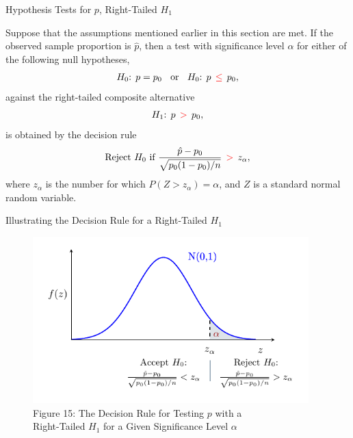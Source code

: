 \documentclass[pdf]{beamer}
\theoremstyle{remark}
\theoremstyle{definition}
\begin{document}
\begin{frame}[t, label=pRT]{Hypothesis Tests for $p$, Right-Tailed $H_1$}
\small
\begin{tcolorbox}[colback=white!5,colframe=franklinblue]%
Suppose that the assumptions mentioned earlier in this section are met. If the observed sample proportion is $\hat{p}$, then a test with significance level $\alpha$ for either of the following null hypotheses, 
\vspace{-1.0ex}
\begin{align*} 
H_0\text{: }  p = p_0 \;\; \text{ or } \;\; H_0\text{: }  p \;\, \textcolor{red}{\leq} \;\, p_0, 
\end{align*} 
\vspace{-1.0ex}
against the right-tailed composite alternative 
\vspace{0.0ex}
\begin{align*} 
H_1\text{: }  p \;\, \textcolor{red}{>} \;\, p_0, 
\end{align*} 
\vspace{-1.0ex}
is obtained by the decision rule 
\vspace{0.0ex}
\begin{equation} 
\text{Reject } H_0 \text{ if } \frac{\hat{p} - p_0}{\sqrt{p_0(1-p_0)/ n}} \;\, \textcolor{red}{>} \;\, z_{\alpha},
\end{equation} 
where $z_{\alpha}$ is the number for which $P(Z > z_{\alpha}) = \alpha$, and $Z$ is a standard normal random variable. 
\end{tcolorbox}
\end{frame}

\begin{frame}[t]{Illustrating the Decision Rule for a Right-Tailed $H_1$ }
\begin{figure}[htbp]
    \centering
    \captionsetup{justification=centering}
    \includegraphics[clip, trim=0.5cm 0.5cm 0.0cm 0cm, width=0.95\textwidth]{Hypothesis_Testing_Module_9_pZ1.pdf}  
    \caption{Figure {\color{franklinblue} 15}: The Decision Rule for Testing $p$ with a \\Right-Tailed $H_1$ for a Given Significance Level $\alpha$}
    \label{fig:gauss7}
\end{figure}
\end{frame}
\end{document}
